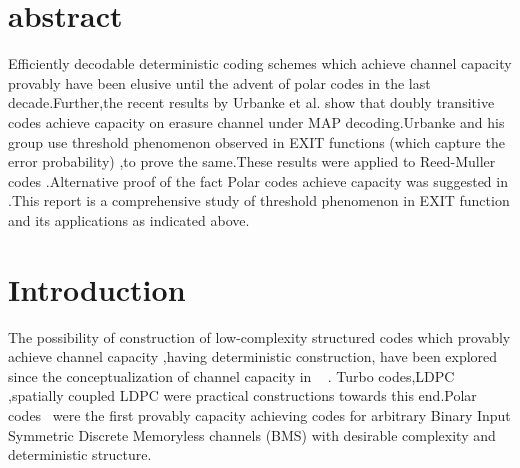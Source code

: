 \documentclass[
10pt, %
a4paper, %
oneside, %
headinclude,footinclude, %
BCOR5mm, %
]{scrartcl}
\begin{document}
\maketitle %


\setcounter{tocdepth}{2} %

\tableofcontents %

\section*{abstract}
Efficiently decodable deterministic coding schemes which achieve channel capacity provably have been elusive until the advent of polar codes\cite{arikan} in the last decade.Further,the recent results by Urbanke et al.\cite{rm1} show that doubly transitive codes achieve capacity on erasure channel under MAP decoding.Urbanke and his group use threshold phenomenon observed in EXIT functions (which capture the error probability) ,to prove the same.These results were applied to Reed-Muller codes \cite{rm1}.Alternative proof of the fact Polar codes achieve capacity was suggested in \cite{vishva}.This report is a comprehensive study of threshold phenomenon in EXIT function and its applications as indicated above.


\section{Introduction}
The possibility of construction of low-complexity structured codes which provably achieve channel capacity ,having deterministic construction, have been explored since the conceptualization of channel capacity in ~\cite{shannon} . Turbo codes,LDPC ,spatially coupled LDPC were practical constructions towards this end.Polar codes~\cite{arikan} were the first provably capacity achieving codes for arbitrary Binary Input Symmetric Discrete Memoryless channels (BMS) with desirable complexity and deterministic structure.
\end{document}
